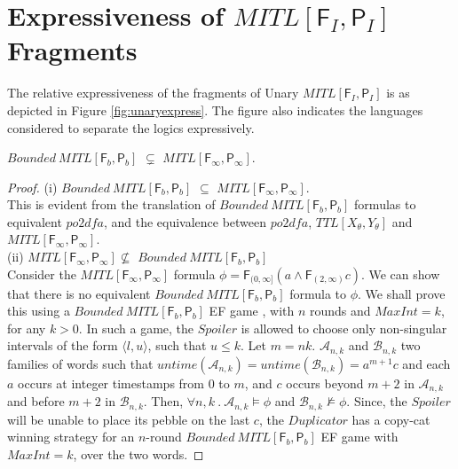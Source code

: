 \documentclass{llncs}
\newcommand{\fut}{\textsf{F}}
\newcommand{\past}{\textsf{P}}
\newcommand{\POTDFA}{\mbox{$\mathit{po2dfa}$}}
\newcommand{\mitlfp}{\mbox{$\mathit{MITL[\fut_I,\past_I]}$}}
\newcommand{\bmitlfp}{\mbox{$\mathit{Bounded ~MITL[\fut_b,\past_b]}$}}
\newcommand{\potdfa}{\POTDFA}
\newcommand{\ttl}{\mbox{$\mathit{TTL[X_\theta, Y_\theta]}$}}
\newcommand{\ssp}{\mbox{$\mathit{Spoiler}$}}
\newcommand{\ddp}{\mbox{$\mathit{Duplicator}$}}
\newcommand{\aaa}{\mathcal A}
\newcommand{\bbb}{\mathcal B}
\newcommand{\maxint}{\mbox{$\mathit{MaxInt}$}}
\newcommand{\mitlfpinf}{\mbox{$\mathit{MITL[\fut_\infty,\past_\infty]}$}}
\newcommand{\mitlfpb}{\bmitlfp}
\begin{document}
\section{Expressiveness of \mitlfp\/ Fragments}
\label{app:express}
The relative expressiveness of the fragments of Unary \mitlfp\/ is as depicted in Figure \ref{fig:unaryexpress}. The figure also indicates the languages considered to separate the logics expressively.


\begin{theorem}
\label{thm:express1}
\mitlfpb\/ $\subsetneq$ \mitlfpinf.
\end{theorem}
\begin{proof}
(i) \mitlfpb\/ $\subseteq$ \mitlfpinf.\\
This is evident from the translation of \mitlfpb\/ formulas to equivalent \potdfa, and the equivalence between \potdfa, \ttl\/ and \mitlfpinf.\\
(ii) \mitlfpinf $\nsubseteq$ \mitlfpb\\
Consider the \mitlfpinf\/ formula $\phi = \fut_{(0,\infty]}(a \land \fut_{(2,\infty)}c)$. We can show that there is no equivalent \mitlfpb\/ formula to $\phi$.
We shall prove this using a \mitlfpb\/ EF game \cite{PS11}, with $n$ rounds and $\maxint = k$, for any $k>0$. In such a game, the \ssp\/ is allowed to choose only non-singular intervals of the form $\langle l,u\rangle$, such that $u\leq k$. Let $m=nk$. $\aaa_{n,k}$ and $\bbb_{n,k}$ two families of words such that $untime(\aaa_{n,k})=untime(\bbb_{n,k})= a^{m+1}c$ and each $a$ occurs at integer timestamps from $0$ to $m$, and $c$ occurs beyond $m+2$ in $\aaa_{n,k}$ and before $m+2$ in $\bbb_{n,k}$. Then, $\forall n,k ~.~ \aaa_{n,k} \models \phi$ and $\bbb_{n,k}\not\models\phi$. Since, the \ssp\/ will be unable to place its pebble on the last $c$, the \ddp\/ has a copy-cat winning strategy for an $n$-round \mitlfpb\/ EF game with $\maxint = k$, over the two words. 
\end{proof}
\end{document}
